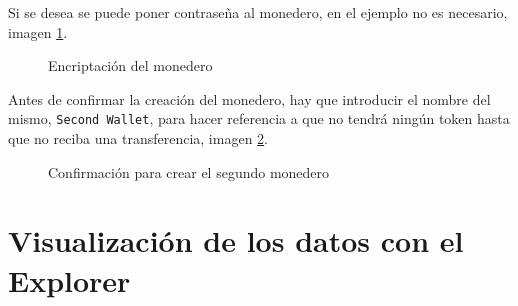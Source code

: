 Si se desea se puede poner contraseña al monedero, en el ejemplo no es necesario, imagen \ref{fig:wallet-16}.

\begin{figure}[H]
	\centering
	\caption{Encriptación del monedero}
	\label{fig:wallet-16}
\end{figure}

\newpage

Antes de confirmar la creación del monedero, hay que introducir el nombre del mismo, \texttt{Second Wallet}, para hacer referencia a que no tendrá ningún token hasta que no reciba una transferencia, imagen \ref{fig:wallet-17}.

\begin{figure}[H]
	\centering
	\caption{Confirmación para crear el segundo monedero}
	\label{fig:wallet-17}
\end{figure}






\newpage

\section{Visualización de los datos con el Explorer}

\newpage







